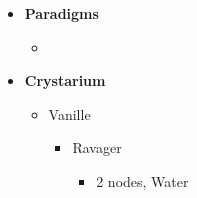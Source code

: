\begin{multicols}{2}
	\begin{menu}
		\begin{itemize}
			\item \textbf{Paradigms}
			      \begin{itemize}
				      \item {}%
				            {\paradigmline[1]{\textit{\com}}{\textit{\rav}}{\textit{\rav}}}%
				            {\paradigmline{\com}{\med}{\rav}}%
				            {\paradigmline{[\rav]}{\rav}{\rav}}%
				            {\paradigmline{[\rav]}{\rav}{\rav}}%
				            {\paradigmline{[\com]}{\rav}{\rav}}
			      \end{itemize}
			\item \textbf{Crystarium}
			      \begin{itemize}
				      \item Vanille
				            \begin{itemize}
					            \item Ravager
					                  \begin{itemize}
						                  \item 2 nodes, Water
					                  \end{itemize}
				            \end{itemize}
			      \end{itemize}
		\end{itemize}
	\end{menu}

	\renewcommand{\first}{[1] Relentless Assault (\com/\rav/\rav)}
	\renewcommand{\second}{[2] Diversity (\com/\med/\rav)}
	\renewcommand{\third}{[3] Tri-Disaster (\rav/\rav/\rav)}
	\renewcommand{\fourth}{[4] Tri-Disaster (\rav/\rav/\rav)}
	\renewcommand{\fifth}{[5] Relentless Assault (\com/\rav/\rav)}

	\vfill


\end{multicols}
